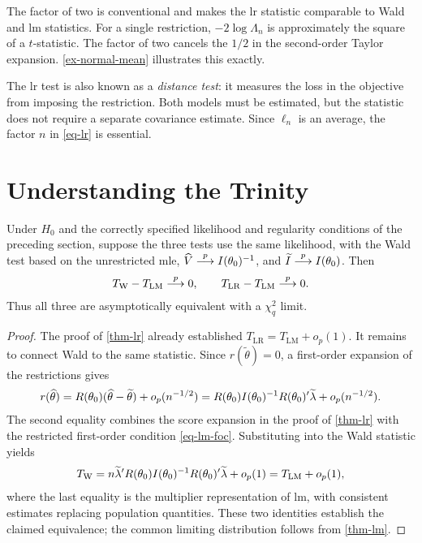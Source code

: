 \documentclass[a4paper,12pt]{article}
\begin{document}
\begin{remark}
	The factor of two is conventional and makes the \gls{lr} statistic comparable to Wald and \gls{lm} statistics.
	For a single restriction, $-2\log\Lambda_n$ is approximately the square of a $t$-statistic.
	The factor of two cancels the $1/2$ in the second-order Taylor expansion.
	\autoref{ex-normal-mean} illustrates this exactly.
\end{remark}

\begin{remark}
	The \gls{lr} test is also known as a \emph{distance test}: it measures the loss in the objective from imposing the restriction.
	Both models must be estimated, but the statistic does not require a separate covariance estimate.
	Since $\ell_n$ is an average, the factor $n$ in \eqref{eq-lr} is essential.
\end{remark}

\section{Understanding the Trinity}

\begin{theorem}\label{thm-trinity}
	Under $H_0$ and the correctly specified likelihood and regularity conditions of the preceding section,
	suppose the three tests use the same likelihood, with the Wald test based on the unrestricted \gls{mle},
	$\widehat V\overset{p}{\longrightarrow} I(\theta_0)^{-1}$, and $\widetilde I\overset{p}{\longrightarrow} I(\theta_0)$.
	Then
	\begin{align}
		T_{\mathrm W}-T_{\mathrm{LM}}\overset{p}{\longrightarrow}0,
		\qquad T_{\mathrm{LR}}-T_{\mathrm{LM}}\overset{p}{\longrightarrow}0.
	\end{align}
	Thus all three are asymptotically equivalent with a $\chi_q^2$ limit.
\end{theorem}
\begin{proof}
	The proof of \autoref{thm-lr} already established $T_{\mathrm{LR}}=T_{\mathrm{LM}}+o_p(1)$.
	It remains to connect Wald to the same statistic.
	Since $r(\widetilde\theta)=0$, a first-order expansion of the restrictions gives
	\begin{align}
		r(\widehat\theta)
		=R(\theta_0)(\widehat\theta-\widetilde\theta)+o_p(n^{-1/2})
		=R(\theta_0)I(\theta_0)^{-1} R(\theta_0)^{\prime}\widetilde\lambda+o_p(n^{-1/2}).
	\end{align}
	The second equality combines the score expansion in the proof of \autoref{thm-lr}
	with the restricted first-order condition \eqref{eq-lm-foc}.
	Substituting into the Wald statistic yields
	\begin{align}
		T_{\mathrm W}
		=n\widetilde\lambda^{\prime} R(\theta_0)I(\theta_0)^{-1} R(\theta_0)^{\prime}\widetilde\lambda+o_p(1)
		=T_{\mathrm{LM}}+o_p(1),
	\end{align}
	where the last equality is the multiplier representation of \gls{lm}, with consistent estimates replacing population quantities.
	These two identities establish the claimed equivalence; the common limiting distribution follows from \autoref{thm-lm}.
\end{proof}
\end{document}
